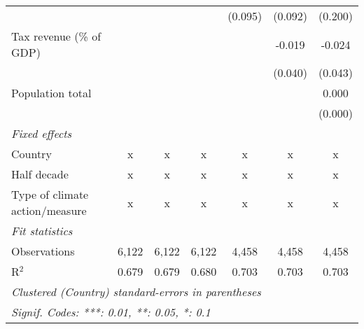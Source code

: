 \begin{tabular}{lcccccc}
                                                          &         &               &                & (0.095)        & (0.092)        & (0.200)\\   
   Tax revenue (\% of GDP)                                &         &               &                &                & -0.019         & -0.024\\   
                                                          &         &               &                &                & (0.040)        & (0.043)\\   
   Population total                                       &         &               &                &                &                & 0.000\\   
                                                          &         &               &                &                &                & (0.000)\\   
   \emph{Fixed effects}\\
   Country                                                & x       & x             & x              & x              & x              & x\\  
   Half decade                                            & x       & x             & x              & x              & x              & x\\  
   Type of climate action/measure                         & x       & x             & x              & x              & x              & x\\  
   \midrule \emph{Fit statistics}\\
   Observations                                           & 6,122   & 6,122         & 6,122          & 4,458          & 4,458          & 4,458\\  
   R$^2$                                                  & 0.679   & 0.679         & 0.680          & 0.703          & 0.703          & 0.703\\  
   \midrule
   \multicolumn{7}{l}{\emph{Clustered (Country) standard-errors in parentheses}}\\
   \multicolumn{7}{l}{\emph{Signif. Codes: ***: 0.01, **: 0.05, *: 0.1}}\\
\end{tabular}
\par\endgroup


